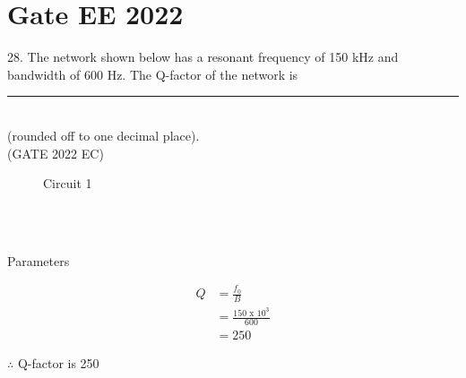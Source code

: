 \documentclass[journal,12pt,twocolumn]{IEEEtran}
\begin{document}


\vspace{3cm}

\title{}
\author{EE23BTECH11054 -  Sai Krishna Shanigarapu$^{*}$
}
\maketitle
\newpage
\bigskip

\section*{Gate EE 2022}
28. \hspace{2pt}The network shown below has a resonant frequency of 150 kHz and bandwidth of 600
Hz. The Q-factor of the network is \rule{1cm}{0.15mm}\\
(rounded off to one decimal place).\\
\hfill(GATE 2022 EC)\\
\begin{figure}[ht]
  \centering
      
  \caption{Circuit 1}
\end{figure}\\
\solution\\

\begin{table}[ht]
    \centering
    
    \caption{Parameters}
    \label{tab:tab1_gate_ee_2022_28_054}
\end{table}
\begin{align}
    Q &= \frac{f_0}{B}\\
    &=\frac{150 \text{ x } 10^3}{600}\\
    &= 250
\end{align}

$\therefore$ Q-factor is 250
\end{document}
